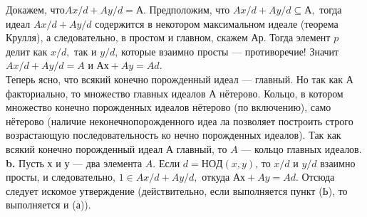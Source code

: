 \documentclass{../../template/mai_book}
\begin{document}
{{\hspace*{0pt} Докажем, $что Ax/d + Ay/d = А.$ Предположим, что $Ax/d + A y/d \subseteq А,$\linebreak
тогда идеал $Ax/d + Ay/d$ содержится в некотором максимальном идеале\linebreak
(теорема Крулля), а следовательно, в простом и главном, скажем $Ар.$\linebreak
Тогда элемент $p$ делит как $x/d,$ так и $y/d$, которые взаимно просты ---\linebreak
противоречие! Значит $Ax/d + Ay/d = A$ и $Ах + Ay = Ad$.\\
\hspace*{0pt} Теперь ясно, что всякий конечно порожденный идеал --- главный. Но\linebreak
так как $А$ факториально, то множество главных идеалов $А$ нётерово.\linebreak
Кольцо, в котором множество конечно порожденных идеалов нётерово\linebreak
(по включению), само нётерово (наличие неконечнопорожденного идеа­\linebreak
ла позволяет построить строго возрастающую последовательность ко­\linebreak
нечно порожденных идеалов). Так как всякий конечно порожденный\linebreak
идеал $А$ главный, то $A$ --- кольцо главных идеалов.\\

\hspace*{15pt}\textbf{b.} Пусть $х$ и $у$ --- два элемента $A$. Если $d = НОД(x,y)$, то $x/d$\linebreak
и $y/d$ взаимно просты, и следовательно, $1 \in Ax/d + Ay/d,$ откуда\linebreak
$Ах + Ay = Ad$. Отсюда следует искомое утверждение (действительно,\linebreak
если выполняется пункт ($Ь$), то выполняется и ($а$)).\\

}}
\end{document}
